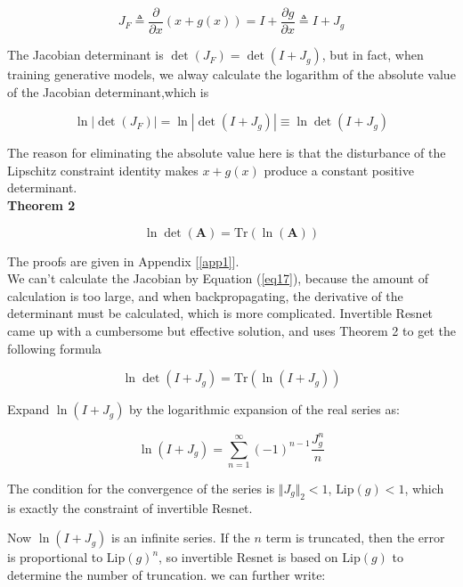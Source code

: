 \documentclass[final]{cvpr}
\begin{document}
\begin{equation}
   J_F\triangleq \frac{\partial}{\partial x}(x+g(x)) = I + \frac{\partial g}{\partial x}\triangleq I + J_g
\end{equation}

The Jacobian determinant is $\det(J_F)=\det (I+J_g)$, but in fact, when training generative models, we alway calculate the logarithm of the absolute value of the Jacobian determinant,which is

\begin{equation}
   \ln |\det(J_F)| = \ln |\det(I + J_g)|\equiv \ln \det(I + J_g)
   \label{eq17}
\end{equation}

The reason for eliminating the absolute value here is that the disturbance of the Lipschitz constraint identity makes $x + g(x)$ produce a constant positive determinant.\\


\noindent \textbf{Theorem 2}

\begin{equation}
   \ln\det(\boldsymbol{A}) = \text{Tr}(\ln (\boldsymbol{A}))
\end{equation}

\noindent The proofs are given in Appendix [\ref{app1}].\\


We can't calculate the Jacobian by Equation (\ref{eq17}), because the amount of calculation is too large, and when backpropagating, the derivative of the determinant must be calculated, which is more complicated. Invertible Resnet came up with a cumbersome but effective solution, and uses Theorem 2 to get the following formula


\begin{equation}
   \ln\det(I + J_g) = \text{Tr}(\ln (I+J_g))
\end{equation}
   

\noindent Expand $\ln (I+J_g)$ by the logarithmic expansion of the real series as:

\begin{equation}
   \ln (I + J_g) = \sum_{n=1}^{\infty}(-1)^{n-1}\frac{J_g^n}{n}
   \label{eq20}
\end{equation}

The condition for the convergence of the series is $\Vert J_g\Vert_2 <1$, $\text{Lip}(g) <1$, which is exactly the constraint of invertible Resnet.

Now $\ln (I + J_g)$ is an infinite series. If the $n$ term is truncated, then the error is proportional to $\text{Lip}(g)^n$, so invertible Resnet is based on $\text{Lip} (g)$ to determine the number of truncation. we can further write:
\end{document}
